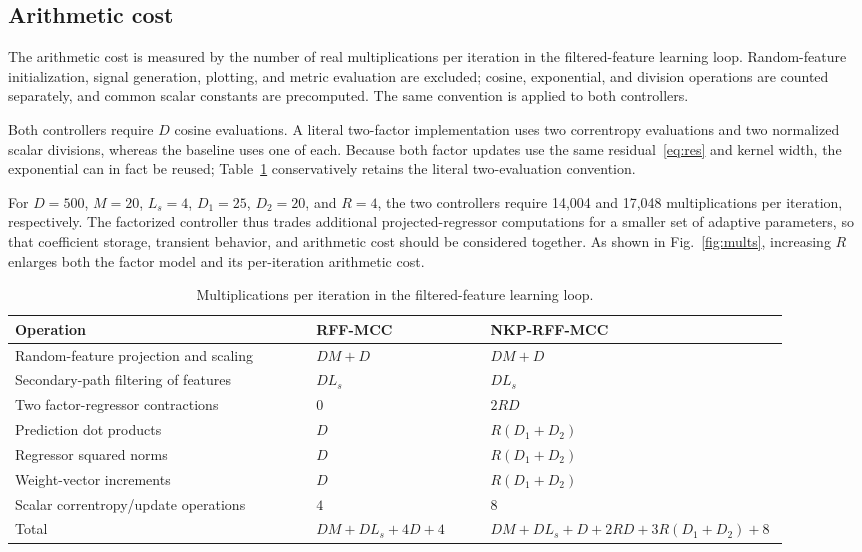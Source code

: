 \documentclass[preprint,12pt]{elsarticle}
\begin{document}
\subsection{Arithmetic cost}

The arithmetic cost is measured by the number of real multiplications per iteration in the filtered-feature learning loop. Random-feature initialization, signal generation, plotting, and metric evaluation are excluded; cosine, exponential, and division operations are counted separately, and common scalar constants are precomputed. The same convention is applied to both controllers.

Both controllers require $D$ cosine evaluations. A literal two-factor implementation uses two correntropy evaluations and two normalized scalar divisions, whereas the baseline uses one of each. Because both factor updates use the same residual~\eqref{eq:res} and kernel width, the exponential can in fact be reused; Table~\ref{tab:mults} conservatively retains the literal two-evaluation convention.

For $D = 500$, $M = 20$, $L_s = 4$, $D_1 = 25$, $D_2 = 20$, and $R = 4$, the two controllers require 14,004 and 17,048 multiplications per iteration, respectively. The factorized controller thus trades additional projected-regressor computations for a smaller set of adaptive parameters, so that coefficient storage, transient behavior, and arithmetic cost should be considered together. As shown in Fig.~\ref{fig:mults}, increasing $R$ enlarges both the factor model and its per-iteration arithmetic cost.

\begin{table}[t]
\centering
\caption{Multiplications per iteration in the filtered-feature learning loop.}
\label{tab:mults}
\begin{tabular}{p{0.38\linewidth}p{0.22\linewidth}p{0.30\linewidth}}
\toprule
Operation & RFF-MCC & NKP-RFF-MCC \\
\midrule
Random-feature projection and scaling & $DM + D$ & $DM + D$ \\
Secondary-path filtering of features & $DL_s$ & $DL_s$ \\
Two factor-regressor contractions & $0$ & $2RD$ \\
Prediction dot products & $D$ & $R(D_1 + D_2)$ \\
Regressor squared norms & $D$ & $R(D_1 + D_2)$ \\
Weight-vector increments & $D$ & $R(D_1 + D_2)$ \\
Scalar correntropy/update operations & $4$ & $8$ \\
\midrule
Total & $DM + DL_s + 4D + 4$ & $DM + DL_s + D + 2RD + 3R(D_1 + D_2) + 8$ \\
\bottomrule
\end{tabular}
\end{table}
\end{document}
